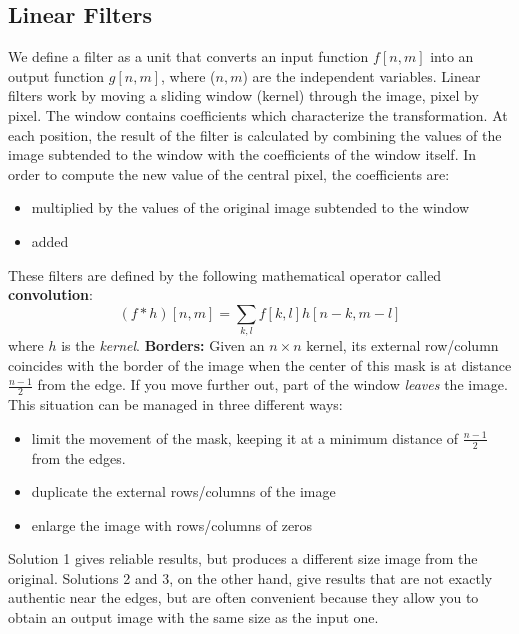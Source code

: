 \subsection{Linear Filters}
We define a filter as a unit that converts an input function $f[n,m]$ into an output function $g[n,m]$, where ($n,m$) are the independent variables. \newline
Linear filters work by moving a sliding window (kernel) through the image, pixel by pixel. The window contains coefficients which characterize the transformation. At each position, the result of the filter is calculated by combining the values of the image subtended to the window with the coefficients of the window itself. In order to compute the new value of the central pixel, the coefficients are:
\begin{itemize}
    \item multiplied by the values of the original image subtended to the window
    \item added
\end{itemize}
These filters are defined by the following mathematical operator called \textbf{convolution}:
\[(f * h)[n,m] = \sum_{k,l}f[k,l]h[n-k, m-l]\]
where $h$ is the \textit{kernel}.\newline \newline
\textbf{Borders:}\newline
Given an $n \times n$ kernel, its external row/column coincides with the border of the image when the center of this mask is at distance $\frac{n-1}{2}$ from the edge. If you move further out, part of the window \textit{leaves} the image.\newline
This situation can be managed in three different ways:
\begin{itemize}
    \item limit the movement of the mask, keeping it at a minimum distance of $\frac{n-1}{2}$ from the edges.
    \item duplicate the external rows/columns of the image
    \item enlarge the image with rows/columns of zeros
\end{itemize}
Solution 1 gives reliable results, but produces a different size image from the original. Solutions 2 and 3, on the other hand, give results that are not exactly authentic near the edges, but are often convenient because they allow you to obtain an output image with the same size as the input one.

